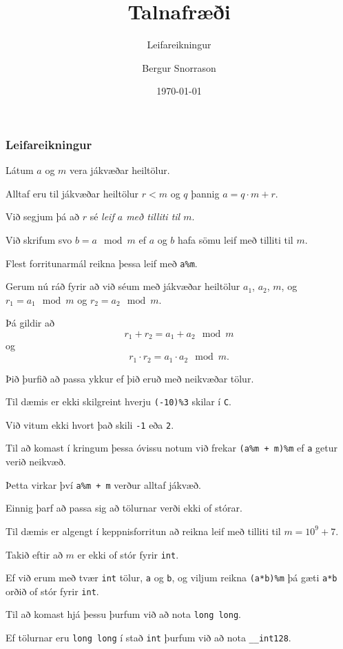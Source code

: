 \title{Talnafræði}
\subtitle{Leifareikningur}
\author{Bergur Snorrason}
\date{\today}



\frame{\titlepage}

{
	\frametitle{Leifareikningur}
	{
		\item<1-> Látum $a$ og $m$ vera jákvæðar heiltölur.
		\item<2-> Alltaf eru til jákvæðar heiltölur $r < m$ og $q$ þannig $a = q \cdot m + r$.
		\item<3-> Við segjum þá að $r$ sé \emph{leif $a$ með tilliti til $m$}.
		\item<4-> Við skrifum svo $b = a \mod m$ ef $a$ og $b$ hafa sömu leif með tilliti til $m$.
		\item<5-> Flest forritunarmál reikna þessa leif með \texttt{a\%m}.
		\item<6-> Gerum nú ráð fyrir að við séum með jákvæðar heiltölur $a_1$, $a_2$, $m$, og $r_1 = a_1 \mod m$ og $r_2 = a_2 \mod m$.
		\item<7-> Þá gildir að
		\[
			r_1 + r_2 = a_1 + a_2 \mod m
		\]
		 og
		\[
			r_1 \cdot r_2 = a_1 \cdot a_2 \mod m.
		\]
	}
}

{
	{
		\item<1-> Þið þurfið að passa ykkur ef þið eruð með neikvæðar tölur.
		\item<2-> Til dæmis er ekki skilgreint hverju \texttt{(-10)\%3} skilar í \texttt{C}.
		\item<3-> Við vitum ekki hvort það skili \texttt{-1} eða \texttt{2}.
		\item<4-> Til að komast í kringum þessa óvissu notum við frekar \texttt{(a\%m + m)\%m} ef \texttt{a} getur verið neikvæð.
		\item<5-> Þetta virkar því \texttt{a\%m + m} verður alltaf jákvæð.
	}
}

{
	{
		\item<1-> Einnig þarf að passa sig að tölurnar verði ekki of stórar.
		\item<2-> Til dæmis er algengt í keppnisforritun að reikna leif með tilliti til $m = 10^9 + 7$.
		\item<3-> Takið eftir að $m$ er ekki of stór fyrir \texttt{int}.
		\item<4-> Ef við erum með tvær \texttt{int} tölur, \texttt{a} og \texttt{b}, og viljum reikna \texttt{(a*b)\%m}
					þá gæti \texttt{a*b} orðið of stór fyrir \texttt{int}.
		\item<5-> Til að komast hjá þessu þurfum við að nota \texttt{long long}.
		\item<6-> Ef tölurnar eru \texttt{long long} í stað \texttt{int} þurfum við að nota \texttt{\_\_int128}.
		\item<7->[] 
	}
}

